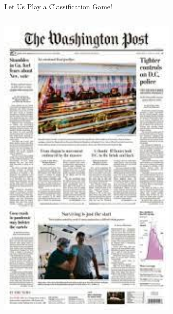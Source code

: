 \documentclass[notes, aspectratio=1610]{beamer}
\begin{document}
\begin{frame}{Let Us Play a Classification Game!}
\begin{columns}
\begin{column}{0.23\textwidth}
			\includegraphics[width=1\textwidth]{images/wp}
		\end{column}
		\begin{column}{0.25\textwidth}

\end{column}
\end{columns}
\end{frame}
\end{document}

